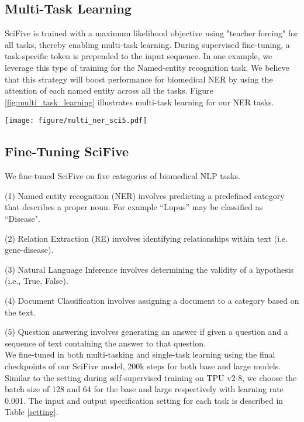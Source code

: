 \documentclass[nocrop]{bioinfo}
\begin{document}
\begin{methods}
\subsection{Multi-Task Learning}
SciFive is trained with a maximum likelihood objective using "teacher forcing" \citep{DBLP:journals/corr/abs-1910-10683} for all tasks, thereby enabling multi-task learning. During supervised fine-tuning, a task-specific token is prepended to the input sequence. In one example, we leverage this type of training for the Named-entity recognition task. We believe that this strategy will boost performance for biomedical NER by using the attention of each named entity across all the tasks. Figure \ref{fig:multi_task_learning} illustrates multi-task learning for our NER tasks.

\begin{figure*}
    \centering
    \texttt{[image: figure/multi\_ner\_sci5.pdf]}
    \caption{An illustration about Multi-task learning in Name-entity Recognition Tasks}
    \label{fig:multi_task_learning}
\end{figure*}



\subsection{Fine-Tuning SciFive}
We fine-tuned SciFive on five categories of biomedical NLP tasks.

(1)   Named entity recognition (NER)  involves predicting a predefined \indent category that describes a proper noun. For example “Lupus” may be \indent classified as “Disease".

(2)   Relation Extraction (RE) involves identifying relationships within \indent text           (i.e. gene-disease).

(3)   Natural Language Inference involves determining the         validity of a \indent hypothesis (i.e., True, False).

(4)   Document Classification involves assigning a document       to a \indent category based on the text.

(5)   Question answering involves generating an answer if         given a \indent question and a sequence of text containing the answer to that question. \\
 
We fine-tuned in both multi-tasking and single-task learning using the final checkpoints of our SciFive model, 200k steps for both base and large models. Similar to the setting during self-supervised training on TPU v2-8, we choose the batch size of 128 and 64 for the base and large respectively with learning rate 0.001. The input and output specification setting for each task is described in Table \ref{setting}.


\end{methods}
\end{document}
